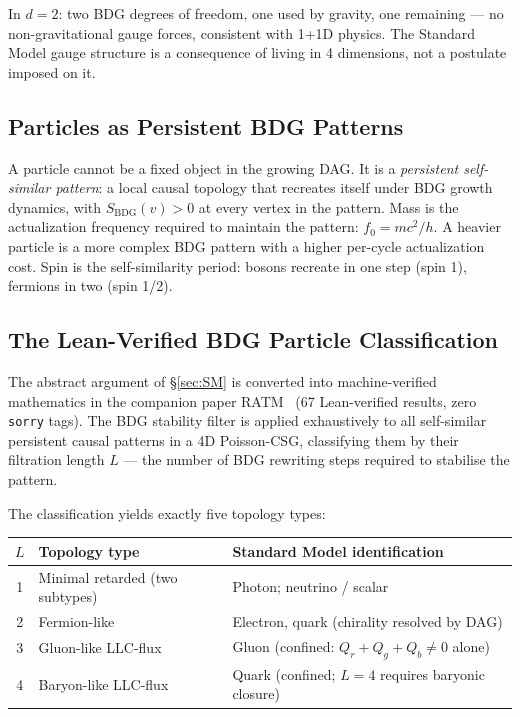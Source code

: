 \documentclass[11pt,a4paper]{article}
\newcommand{\SBDG}{S_{\mathrm{BDG}}}
\begin{document}
In $d = 2$: two BDG degrees of freedom, one used by gravity, one
remaining --- no non-gravitational gauge forces, consistent with
1+1D physics. The Standard Model gauge structure is a consequence of
living in 4 dimensions, not a postulate imposed on it.

\subsection{Particles as Persistent BDG Patterns}

A particle cannot be a fixed object in the growing DAG. It is a
\emph{persistent self-similar pattern}: a local causal topology that
recreates itself under BDG growth dynamics, with $\SBDG(v) > 0$ at
every vertex in the pattern. Mass is the actualization frequency required
to maintain the pattern: $f_0 = mc^2/h$. A heavier particle is a more
complex BDG pattern with a higher per-cycle actualization cost.
Spin is the self-similarity period: bosons recreate in one step (spin 1),
fermions in two (spin 1/2).

\subsection{The Lean-Verified BDG Particle Classification}

The abstract argument of \S\ref{sec:SM} is converted into machine-verified
mathematics in the companion paper RATM~\citep{Sandeman2026RATM}
(67 Lean-verified results, zero \texttt{sorry} tags). The BDG stability
filter is applied exhaustively to all self-similar persistent causal
patterns in a 4D Poisson-CSG, classifying them by their filtration length
$L$ --- the number of BDG rewriting steps required to stabilise the pattern.

The classification yields exactly five topology types:

\begin{center}
\renewcommand{\arraystretch}{1.25}
\begin{tabular}{cll}
\toprule
$L$ & Topology type & Standard Model identification \\
\midrule
1 & Minimal retarded (two subtypes) & Photon; neutrino / scalar \\
2 & Fermion-like & Electron, quark (chirality resolved by DAG) \\
3 & Gluon-like LLC-flux & Gluon (confined: $Q_r + Q_g + Q_b \neq 0$ alone) \\
4 & Baryon-like LLC-flux & Quark (confined; $L=4$ requires baryonic closure) \\
\bottomrule
\end{tabular}
\end{center}
\end{document}
